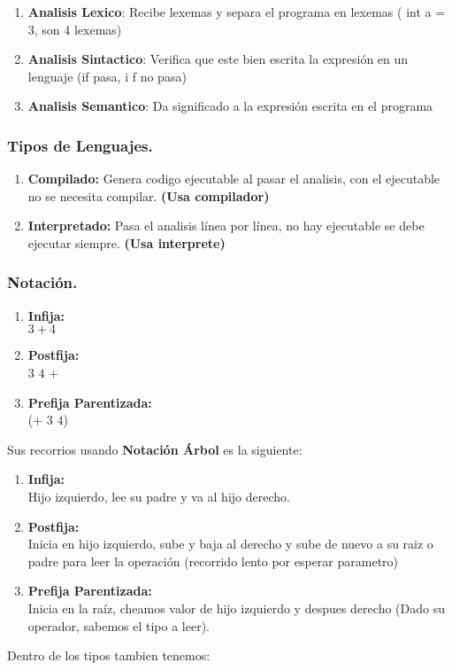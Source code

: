 \documentclass[12pt]{article}
\begin{document}
\begin{enumerate}
    \item \textbf{Analisis Lexico}: Recibe lexemas y separa el programa en lexemas ( int a = 3, son 4 lexemas)
    \item \textbf{Analisis Sintactico}: Verifica que este bien escrita la expresión en un lenguaje (if pasa, i f no pasa)
    \item \textbf{Analisis Semantico}: Da significado a la expresión escrita en el programa 
\end{enumerate}

{\color{blue} \subsubsection*{Tipos de Lenguajes.}}
\vspace{-0.5em}
\begin{enumerate}
    \item \textbf{Compilado:} Genera codigo ejecutable al pasar el analisis, con el ejecutable no se necesita compilar. \textbf{(Usa compilador)} 
    \item \textbf{Interpretado:} Pasa el analisis línea por línea, no hay ejecutable se debe ejecutar siempre. \textbf{(Usa interprete)}
\end{enumerate}

{\color{blue} \subsubsection*{Notación.}}
\vspace{-0.5em}
\begin{enumerate}
    \item \textbf{Infija:} \\
    $3 + 4$
    \item \textbf{Postfija:}\\ 
    $3$ $4$ + 
    \item \textbf{Prefija Parentizada:} \\
    (+ $3$ $4$) 
\end{enumerate}
Sus recorrios usando \textbf{Notación Árbol} es la siguiente:\\
\begin{enumerate}
    \item \textbf{Infija:} \\
    Hijo izquierdo, lee su padre y va al hijo derecho.
    \item \textbf{Postfija:}\\ 
    Inicia en hijo izquierdo, sube y baja al derecho y sube de nuevo a su raiz o padre para leer la operación (recorrido lento por esperar parametro)
    \item \textbf{Prefija Parentizada:} \\
    Inicia en la raíz, cheamos valor de hijo izquierdo y  despues derecho (Dado su operador, sabemos el tipo a leer).  
\end{enumerate}
Dentro de los tipos tambien tenemos:\\
\end{document}
